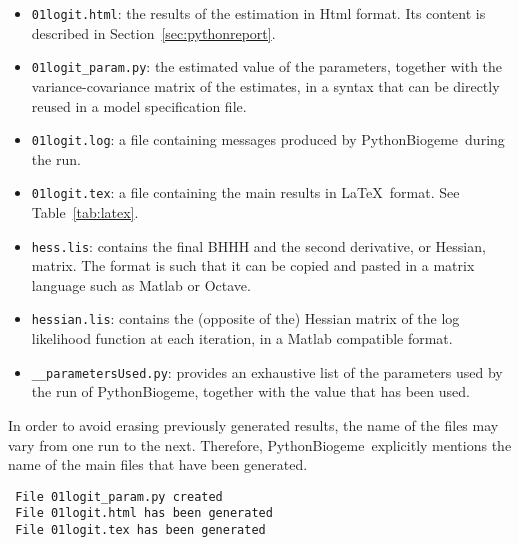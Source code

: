 \documentclass[12pt,a4paper]{article}
\newcommand{\PBIOGEME}{PythonBiogeme}
\begin{document}
\begin{itemize}
\item \lstinline$01logit.html$: the results of the estimation in Html
  format. Its content is described in Section~\ref{sec:pythonreport}.
\item \lstinline$01logit_param.py$: the estimated value of the
  parameters, together with the variance-covariance matrix of the
  estimates, in a syntax that can be directly reused in a model
  specification file.
\item \lstinline$01logit.log$: a file containing messages produced by \PBIOGEME\ during the run.
\item \lstinline$01logit.tex$: a file containing the main results in
  \LaTeX\ format. See Table~\ref{tab:latex}.
\item \lstinline$hess.lis$: contains the final BHHH and the second
  derivative, or Hessian, matrix. The format is such that it can be
  copied and pasted in a matrix language such as Matlab or Octave. 
\item \lstinline$hessian.lis$: contains the (opposite of the) Hessian
  matrix of the log likelihood function at each iteration, in a Matlab
  compatible format. 
\item \lstinline$__parametersUsed.py$: provides an exhaustive list of the
  parameters used by the run of \PBIOGEME, together with the value
  that has been used. 
\end{itemize}

In order to avoid erasing previously generated results, the name of
the files may vary from one run to the next. Therefore,
\PBIOGEME\ explicitly mentions the name of the main files that have
been generated. 

\begin{lstlisting}
 File 01logit_param.py created
 File 01logit.html has been generated
 File 01logit.tex has been generated
\end{lstlisting}
\end{document}
